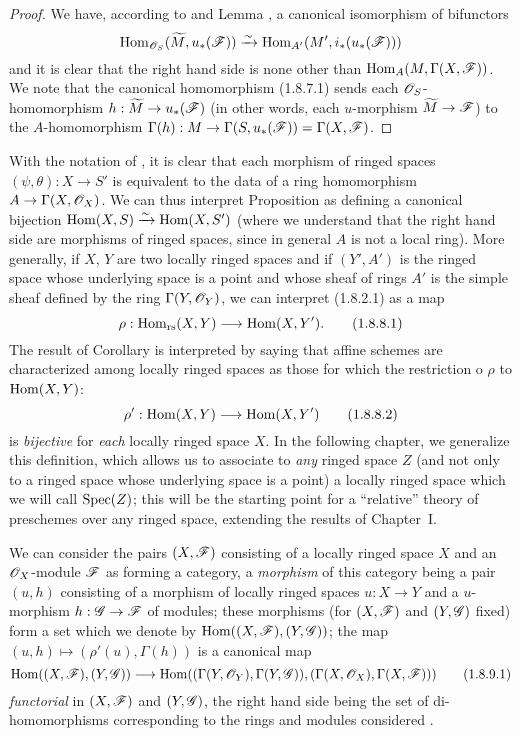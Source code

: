 \begin{proof}
\label{proof-1.1.8.7}
We have, according to  and Lemma , a canonical
isomorphism of bifunctors
\[
  {\mathop{\mathrm{Hom}}\nolimits}_{\mathscr{O}_S}(\widetilde{M},u_*(\mathscr{F}))\xrightarrow{\sim}{\mathop{\mathrm{Hom}}\nolimits}_{A'}(M',i_*(u_*(\mathscr{F})))
\]
and it is clear that the right hand side is none other than ${\mathop{\mathrm{Hom}}\nolimits}_A(M,\Gamma(X,\mathscr{F}))$. We
note that the canonical homomorphism (1.8.7.1) sends each $\mathscr{O}_S$-homomorphism
$h:\widetilde{M}\to u_*(\mathscr{F})$ (in other words, each $u$-morphism $\widetilde{M}\to\mathscr{F}$)
to the $A$-homomorphism $\Gamma(h):M\to\Gamma(S,u_*(\mathscr{F}))=\Gamma(X,\mathscr{F})$.
\end{proof}

\begin{env}[1.8.8]
\label{1.1.8.8}
With the notation of , it is clear  that each morphism
of ringed spaces $(\psi,\theta):X\to S'$ is equivalent to the data of a ring homomorphism
$A\to\Gamma(X,\mathscr{O}_X)$. We can thus interpret Proposition  as defining a canonical
bijection ${\mathop{\mathrm{Hom}}\nolimits}(X,S)\xrightarrow{\sim}{\mathop{\mathrm{Hom}}\nolimits}(X,S')$ (where we understand that the right hand side are
morphisms of ringed spaces, since in general $A$ is not a local ring). More generally, if
$X$, $Y$ are two locally ringed spaces and if $(Y',A')$ is the ringed space whose underlying
space is a point and whose sheaf of rings $A'$ is the simple sheaf defined by the
ring $\Gamma(Y,\mathscr{O}_Y)$, we can interpret (1.8.2.1) as a map
\[
  \rho:{\mathop{\mathrm{Hom}}\nolimits}_\text{rs}(X,Y)\longrightarrow{\mathop{\mathrm{Hom}}\nolimits}(X,Y').
  \tag{1.8.8.1}
\]
The result of Corollary  is interpreted by saying that affine schemes are
characterized among locally ringed spaces as those for which the restriction o $\rho$ to
${\mathop{\mathrm{Hom}}\nolimits}(X,Y)$:
\[
  \rho':{\mathop{\mathrm{Hom}}\nolimits}(X,Y)\longrightarrow{\mathop{\mathrm{Hom}}\nolimits}(X,Y')
  \tag{1.8.8.2}
\]
is {\em bijective} for {\em each} locally ringed space $X$. In the following chapter, we
generalize this definition, which allows us to associate to {\em any} ringed space $Z$ (and
not only to a ringed space whose underlying space is a point) a locally ringed
space which we will call ${\mathop{\mathrm{Spec}}\nolimits}(Z)$; this will be the starting point for a ``relative''
theory of preschemes over any ringed space, extending the results of Chapter~I.
\end{env}

\begin{env}[1.8.9]
\label{1.1.8.9}
We can consider the pairs $(X,\mathscr{F})$ consisting of a locally ringed space $X$ and an
$\mathscr{O}_X$-module $\mathscr{F}$ as forming a category, a {\em morphism} of this category being a
pair $(u,h)$ consisting of a morphism of locally ringed spaces
$u:X\to Y$ and a $u$-morphism $h:\mathscr{G}\to\mathscr{F}$ of modules; these morphisms (for
$(X,\mathscr{F})$ and $(Y,\mathscr{G})$ fixed) form a set which we denote by
${\mathop{\mathrm{Hom}}\nolimits}((X,\mathscr{F}),(Y,\mathscr{G}))$; the map $(u,h)\mapsto(\rho'(u),\Gamma(h))$ is a canonical
map
\[
  {\mathop{\mathrm{Hom}}\nolimits}((X,\mathscr{F}),(Y,\mathscr{G}))
  \longrightarrow{\mathop{\mathrm{Hom}}\nolimits}((\Gamma(Y,\mathscr{O}_Y),\Gamma(Y,\mathscr{G})),(\Gamma(X,\mathscr{O}_X),\Gamma(X,\mathscr{F})))
  \tag{1.8.9.1}
\]
{\em functorial} in $(X,\mathscr{F})$ and $(Y,\mathscr{G})$, the right hand side being the set of
di-homomorphisms corresponding to the rings and modules considered .
\end{env}

